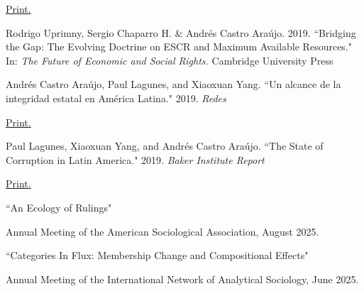 \documentclass[11pt,article,oneside]{memoir}
\begin{document}
\ind \hspace{0.35in} \footnotesize \href{https://www.dejusticia.org/wp-content/uploads/2019/07/Co%CC%81mo-pensar-la-desigualdad-desde-los-derechos-humanos_-v2.pdf}{Print.} 


\ind \normalsize Rodrigo Uprimny, Sergio Chaparro H. \& \colorbox{Gray!15}{Andrés Castro Araújo}. 2019. ``Bridging the Gap: The Evolving Doctrine on ESCR and Maximum Available Resources." In: \emph{The Future of Economic and Social Rights.} Cambridge University Press \medskip

\ind \normalsize \colorbox{Gray!15}{Andrés Castro Araújo}, Paul Lagunes, and Xiaoxuan Yang. ``Un alcance de la integridad estatal en América Latina." 2019. \emph{Redes} \par

\ind \hspace{0.35in} \footnotesize \href{https://www.redesarrollo.pe/wp-content/uploads/2020/10/Un-Alcance-de-la-integridad-estatal-en-America-Latina.pdf}{Print.} \vspace{0.05in}

\ind \normalsize Paul Lagunes, Xiaoxuan Yang, and \colorbox{Gray!15}{Andrés Castro Araújo}. ``The State of Corruption in Latin America." 2019. \emph{Baker Institute Report} \par

\ind \hspace{0.35in} \footnotesize \href{https://www.bakerinstitute.org/research/state-corruption-latin-america/}{Print.} \vspace{0.05in}

\bigskip

\normalsize


\medskip

\ind ``An Ecology of Rulings"

\ind \hspace{0.35in} \footnotesize \textemdash Annual Meeting of the American Sociological Association, August 2025. \normalsize 

\ind ``Categories In Flux: Membership Change and Compositional Effects"

\ind \hspace{0.35in} \footnotesize \textemdash Annual Meeting of the International Network of Analytical Sociology, June 2025. \normalsize
\end{document}
